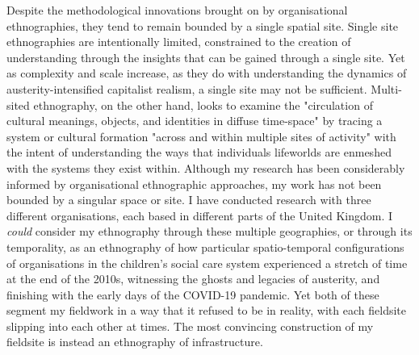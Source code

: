 Despite the methodological innovations brought on by organisational ethnographies, they tend to remain bounded by a single spatial site. Single site ethnographies are intentionally limited, constrained to the creation of understanding through the insights that can be gained through a single site. Yet as complexity and scale increase, as they do with understanding the dynamics of austerity-intensified capitalist realism, a single site may not be sufficient. Multi-sited ethnography, on the other hand, looks to examine the "circulation of cultural meanings, objects, and identities in diffuse time-space" \citep[p. 97]{marcus_ethnography_1995} by tracing a system or cultural formation "across and within multiple sites of activity" with the intent of understanding the ways that individuals lifeworlds are enmeshed with the systems they exist within. Although my research has been considerably informed by organisational ethnographic approaches, my work has not been bounded by a singular space or site. I have conducted research with three different organisations, each based in different parts of the United Kingdom. I \textit{could} consider my ethnography through these multiple geographies, or through its temporality, as an ethnography of how particular spatio-temporal configurations of organisations in the children's social care system experienced a stretch of time at the end of the 2010s, witnessing the ghosts and legacies of austerity, and finishing with the early days of the COVID-19 pandemic. Yet both of these segment my fieldwork in a way that it refused to be in reality, with each fieldsite slipping into each other at times. The most convincing construction of my fieldsite is instead an ethnography of infrastructure. 

